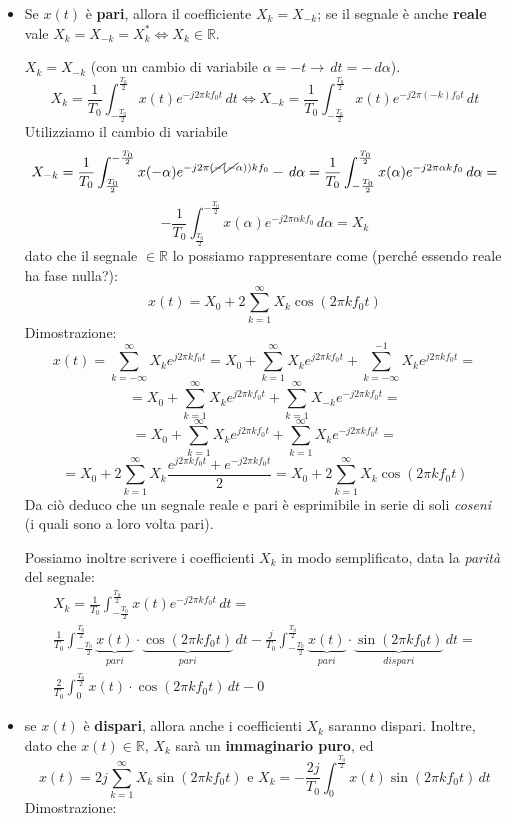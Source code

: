 \documentclass[
  paper=a4,
  ,captions=tableheading
]{scrartcl}
\begin{document}
\begin{enumerate}
  \begin{itemize}
  \item
    Se \(x(t)\) è \textbf{pari}, allora il coefficiente
    \(X_{k} = X_{-k}\); se il segnale è anche \textbf{reale} vale
    \(X_{k}=X_{-k}=X^{*}_{k} \Longleftrightarrow X_k \in \mathbb{R}\).

    \(X_k = X_{-k}\) (con un cambio di variabile
    \(\alpha=-t \to \,dt=-\,d\alpha\)). \[
      X_{k} = \frac{1}{T_0} \int_{-\frac{T_0}{2}}^{\frac{T_0}{2}} x(t) e^{-j2\pi kf_{0}t} \,dt \Longleftrightarrow X_{-k} = \frac{1}{T_0} \int_{-\frac{T_0}{2}}^{\frac{T_0}{2}} x(t) e^{-j2\pi (-k)f_{0}t} \,dt 
      \] Utilizziamo il cambio di variabile \[
      X_{-k} = \frac{1}{T_0} \int_{\frac{T_0}{2}}^{-\frac{T_0}{2}} x(-\alpha) e^{-j2\pi (\cancel{-}(\cancel{-}\alpha)) kf_{0}} -\,d\alpha = \frac{1}{T_0} \int_{-\frac{T_0}{2}}^{\frac{T_0}{2}} x(\alpha) e^{-j2\pi\alpha kf_{0}} \,d\alpha =
      \] \[
      -\frac{1}{T_0} \int_{\frac{T_0}{2}}^{-\frac{T_0}{2}} x(\alpha) e^{-j2\pi\alpha kf_{0}} \,d\alpha = X_k
      \] dato che il segnale \(\in \mathbb{R}\) lo possiamo
    rappresentare come (perché essendo reale ha fase nulla?): \[
      x(t) = X_{0} + 2\sum_{k=1}^{\infty}X_{k}\cos(2\pi kf_{0}t)
      \] Dimostrazione: \[
      x(t) = \sum_{k=-\infty}^{\infty} X_{k} e^{j2\pi kf_{0}t} = X_{0} + \sum_{k=1}^{\infty} X_{k} e^{j2\pi kf_{0}t} + \sum_{k=-\infty}^{-1} X_{k} e^{j2\pi kf_{0}t} =
      \] \[
      = X_{0} + \sum_{k=1}^{\infty} X_{k} e^{j2\pi kf_{0}t} + \sum_{k=1}^{\infty} X_{-k} e^{-j2\pi kf_{0}t} =
      \] \[
      = X_{0} + \sum_{k=1}^{\infty} X_{k} e^{j2\pi kf_{0}t} + \sum_{k=1}^{\infty} X_{k} e^{-j2\pi kf_{0}t} =
      \] \[
      = X_{0} + 2 \sum_{k=1}^{\infty} X_{k} \frac{e^{j2\pi kf_{0}t}+ e^{-j2\pi kf_{0}t}}{2} = X_{0} + 2 \sum_{k=1}^{\infty} X_{k} \cos{(2\pi k f_{0}t)}
      \] Da ciò deduco che un segnale reale e pari è esprimibile in
    serie di soli \emph{coseni} (i quali sono a loro volta pari).

    Possiamo inoltre scrivere i coefficienti \(X_k\) in modo
    semplificato, data la \emph{parità} del segnale: \begin{gather*}
      X_k = \frac{1}{T_0}\int_{-\frac{T_0}{2}}^{\frac{T_0}{2}} x(t) e^{-j2\pi kf_{0}t} \,dt = \\
      \frac{1}{T_0}\int_{-\frac{T_0}{2}}^{\frac{T_0}{2}} \underbrace{x(t)}_{pari}\cdot\underbrace{\cos{(2\pi kf_{0}t)}}_{pari} \,dt - \frac{j}{T_0}\int_{-\frac{T_0}{2}}^{\frac{T_0}{2}} \underbrace{x(t)}_{pari}\cdot\underbrace{\sin{(2\pi kf_{0}t)}}_{dispari}\,dt=
      \\
      \frac{2}{T_0} \int_{0}^{\frac{T_0}{2}} x(t)\cdot\cos{(2\pi kf_{0}t)} \,dt - 0
      \end{gather*}
  \item
    se \(x(t)\) è \textbf{dispari}, allora anche i coefficienti \(X_k\)
    saranno dispari. Inoltre, dato che \(x(t)\in\mathbb{R}\), \(X_k\)
    sarà un \textbf{immaginario puro}, ed \[
      x(t)=2j \sum_{k=1}^{\infty} X_{k} \sin{(2\pi k f_{0}t)} \text{ e } X_k=-\frac{2j}{T_0}\int_{0}^{\frac{T_0}{2}}x(t)\sin(2\pi kf_0 t) \,dt
      \] Dimostrazione:


\end{itemize}
\end{enumerate}
\end{document}
